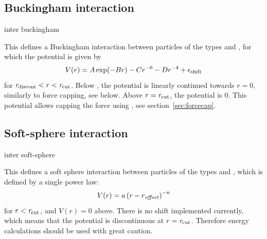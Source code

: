 \subsection{Buckingham interaction}

\begin{essyntax}
  inter   buckingham
     
    
  \begin{features}
  \end{features}
\end{essyntax}
This defines a Buckingham interaction between particles of the types
 and , for which the potential is given by
\begin{equation}
  V(r)= A\exp(-B r) - Cr^{-6} - Dr^{-4} + \mathrm{\mathit{\epsilon_\mathrm{shift}}}
\end{equation}
for $\mathrm{\mathit{r_\mathrm{discont}}} < r < \mathrm{\mathit{r_\mathrm{cut}}}$. Below ,
the potential is linearly continued towards $r=0$, similarly to force capping,
see below. Above $r=\mathrm{\mathit{r_\mathrm{cut}}}$, the potential is $0$. This potential
allows capping the force using , see
section~\ref{sec:forcecap}.

\subsection{Soft-sphere interaction}

\begin{essyntax}
  inter  
  soft-sphere    
  \begin{features}
  \end{features}
\end{essyntax}
This defines a soft sphere interaction between particles of the types
 and , which is defined by a single power law:
\begin{equation}
  V(r)=a\left(r-r_\mathrm{\mathrm{\mathit{offset}}}\right)^{-n}
\end{equation}
for $r<\mathrm{\mathit{r_\mathrm{cut}}}$, and $V(r)=0$ above. There is no shift
implemented currently, which means that the potential is discontinuous
at $r=\mathrm{\mathit{r_\mathrm{cut}}}$. Therefore energy calculations should be
used with great caution.

